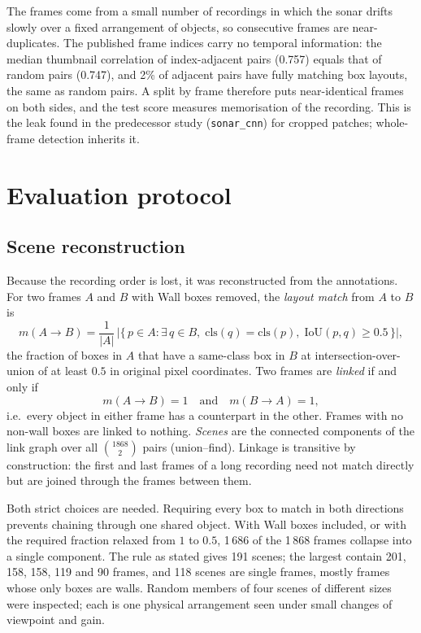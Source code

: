 \documentclass[11pt,a4paper]{article}
\begin{document}
The frames come from a small number of recordings in which the sonar drifts
slowly over a fixed arrangement of objects, so consecutive frames are
near-duplicates. The published frame indices carry no temporal information:
the median thumbnail correlation of index-adjacent pairs (0.757) equals that
of random pairs (0.747), and 2\% of adjacent pairs have fully matching box
layouts, the same as random pairs. A split by frame therefore puts
near-identical frames on both sides, and the test score measures
memorisation of the recording. This is the leak found in the predecessor
study (\texttt{sonar\_cnn}) for cropped patches; whole-frame detection
inherits it.

\section{Evaluation protocol}
\label{sec:split}

\subsection{Scene reconstruction}

Because the recording order is lost, it was reconstructed from the
annotations. For two frames $A$ and $B$ with Wall boxes removed, the
\emph{layout match} from $A$ to $B$ is
\begin{equation}
  m(A \to B) = \frac{1}{|A|}\,\bigl|\{\, p \in A : \exists\, q \in B,\;
  \mathrm{cls}(q) = \mathrm{cls}(p),\; \mathrm{IoU}(p, q) \ge 0.5 \,\}\bigr| ,
\end{equation}
the fraction of boxes in $A$ that have a same-class box in $B$ at
intersection-over-union of at least $0.5$ in original pixel coordinates. Two
frames are \emph{linked} if and only if
\begin{equation}
  m(A \to B) = 1 \quad\text{and}\quad m(B \to A) = 1 ,
\end{equation}
i.e.\ every object in either frame has a counterpart in the other. Frames
with no non-wall boxes are linked to nothing. \emph{Scenes} are the connected
components of the link graph over all $\binom{1868}{2}$ pairs (union--find).
Linkage is transitive by construction: the first and last frames of a long
recording need not match directly but are joined through the frames between
them.

Both strict choices are needed. Requiring every box to match in both
directions prevents chaining through one shared object. With Wall boxes
included, or with the required fraction relaxed from $1$ to $0.5$, 1\,686 of
the 1\,868 frames collapse into a single component. The rule as stated gives
191 scenes; the largest contain 201, 158, 158, 119 and 90 frames, and 118
scenes are single frames, mostly frames whose only boxes are walls. Random
members of four scenes of different sizes were inspected; each is one
physical arrangement seen under small changes of viewpoint and gain.
\end{document}
